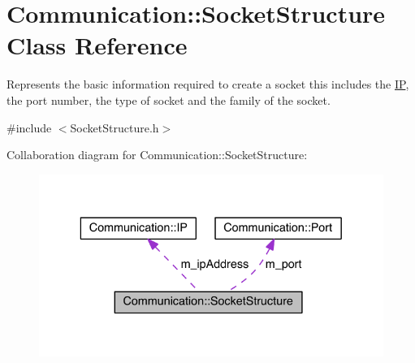 \hypertarget{class_communication_1_1_socket_structure}{}\section{Communication\+:\+:Socket\+Structure Class Reference}
\label{class_communication_1_1_socket_structure}


Represents the basic information required to create a socket this includes the \hyperlink{class_communication_1_1_i_p}{I\+P}, the port number, the type of socket and the family of the socket.  




{\ttfamily \#include $<$Socket\+Structure.\+h$>$}



Collaboration diagram for Communication\+:\+:Socket\+Structure\+:\nopagebreak
\begin{figure}[H]
\begin{center}
\leavevmode
\includegraphics[width=325pt]{class_communication_1_1_socket_structure__coll__graph}
\end{center}
\end{figure}

